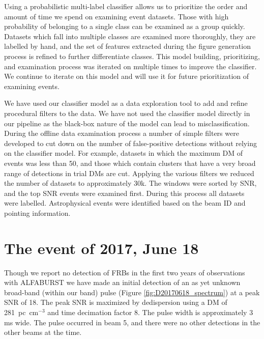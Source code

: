 \documentclass[a4paper,fleqn,usenatbib]{mnras}
\begin{document}
Using a probabilistic multi-label classifier allows us to prioritize
the order and amount of time we spend on examining event
datasets. Those with high probability of belonging to a single class
can be examined as a group quickly.  Datasets which fall into multiple
classes are examined more thoroughly, they are labelled by hand, and
the set of features extracted during the figure generation process is
refined to further differentiate classes. This model building,
prioritizing, and examination process was iterated on multiple times
to improve the classifier. We continue to iterate on this model and
will use it for future prioritization of examining events.


We have used our classifier model as a data exploration tool to add
and refine procedural filters to the data. We have not used the
classifier model directly in our pipeline as the black-box nature of
the model can lead to misclassification.  During the offline data
examination process a number of simple filters were developed to cut
down on the number of false-positive detections without relying on the
classifier model. For example, datasets in which the maximum DM of
events was less than 50, and those which contain clusters that have a
very broad range of detections in trial DMs are cut.
Applying the various filters we reduced the number of datasets to
approximately 30k. The windows were sorted by SNR, and the top SNR
events were examined first.  During this process all datasets were
labelled. Astrophysical events were identified based on the beam ID
and pointing information.


\section{The event of 2017, June 18}
\label{sec:18062017}

Though we report no detection of FRBs in the first two years of
observations with ALFABURST we have made an initial detection of an as
yet unknown broad-band (within our band) pulse (Figure
\ref{fig:D20170618_spectrum}) at a peak SNR of 18. The peak SNR is
maximized by dedispersion using a DM of 281~pc~cm$^{-3}$ and time
decimation factor 8. The pulse width is approximately 3 ms wide. The
pulse occurred in beam 5, and there were no other detections in the
other beams at the time.
\end{document}
